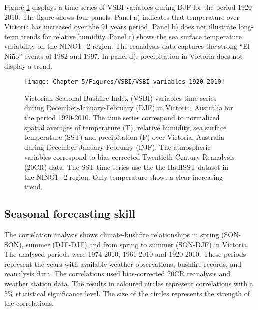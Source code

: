 Figure \ref{fig:Victorian Seasonal Bushfire Index variables time series during December-January-February in Victoria, Australia for the period 1920-2010}
displays a time series of VSBI variables during DJF for the period
1920-2010. The figure shows four panels. Panel a) indicates that temperature
over Victoria has increased over the 91 years period. Panel b) does
not illustrate long-term trends for relative humidity. Panel c) shows
the sea surface temperature variability on the NINO1+2 region. The
reanalysis data captures the strong \textquotedblleft El Ni\~no\textquotedblright{}
events of 1982 and 1997. In panel d), precipitation in Victoria does
not display a trend. 

\begin{figure}[h]
\noindent \begin{centering}
\texttt{[image: Chapter\_5/Figures/VSBI/VSBI\_variables\_1920\_2010]}
\par\end{centering}

\caption[Victorian Seasonal Bushfire Index (VSBI) variables time series during
December-January-February (DJF) in Victoria, Australia for the period
1920-2010]{Victorian Seasonal Bushfire Index (VSBI) variables time series during
December-January-February (DJF) in Victoria, Australia for the period
1920-2010. The time series correspond to normalized spatial averages
of temperature (T), relative humidity, sea surface temperature (SST)
and precipitation (P) over Victoria, Australia during December-January-February
(DJF). The atmospheric variables correspond to bias-corrected Twentieth
Century Reanalysis (20CR) data. The SST time series use the the HadISST
dataset in the NINO1+2 region. Only temperature shows a clear increasing
trend. \label{fig:Victorian Seasonal Bushfire Index variables time series during December-January-February in Victoria, Australia for the period 1920-2010}}


\end{figure}



\subsection{Seasonal forecasting skill}

\LyXZeroWidthSpace The correlation analysis shows climate-bushfire
relationships in spring (SON-SON), summer (DJF-DJF) and from spring
to summer (SON-DJF) in Victoria. The analysed periods were 1974-2010,
1961-2010 and 1920-2010. These periods represent the years with available
weather observations, bushfire records, and reanalysis data. The correlations
used bias-corrected 20CR reanalysis and weather station data. The
results in coloured circles represent correlations with a 5\% statistical
significance level. The size of the circles represents the strength
of the correlations. 



